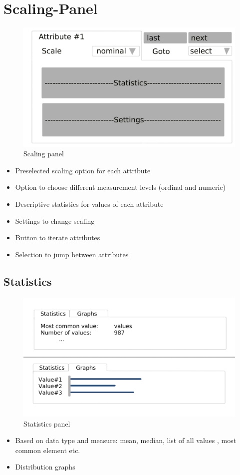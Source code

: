 \documentclass[]{report}
\begin{document}
\section{Scaling-Panel}
\begin{figure}[H]
	\includegraphics[width=\linewidth]{mock_up/panel-3.png}
	\caption{Scaling panel}
	\label{fig:p2}
\end{figure}
\begin{itemize}
	\item Preselected scaling option for each attribute
	\item Option to choose different measurement levels (ordinal and numeric)
	\item Descriptive statistics for values of each attribute
	\item Settings to change scaling
	\item Button to iterate attributes
	\item Selection to jump between attributes
\end{itemize}

\subsection{Statistics}
\begin{figure}[H]
	\includegraphics[width=\linewidth]{mock_up/stat.png}
	\caption{Statistics panel}
	\label{fig:s1}
\end{figure}
\begin{itemize}
	\item Based on data type and measure: mean, median, list of all values , most common element etc.
	\item Distribution graphs
\end{itemize}
\end{document}
